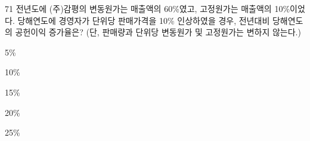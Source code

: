 \begin{question}{71}
전년도에 (주)감평의 변동원가는 매출액의 60\%였고, 고정원가는 매출액의 10\%이었다. 당해연도에 경영자가 단위당 판매가격을 10\% 인상하였을 경우, 전년대비 당해연도의 공헌이익 증가율은? (단, 판매량과 단위당 변동원가 및 고정원가는 변하지 않는다.)
\begin{choices}
  \item 5\%
  \item 10\%
  \item 15\%
  \item 20\%
  \item 25\%
\end{choices}
\end{question}
